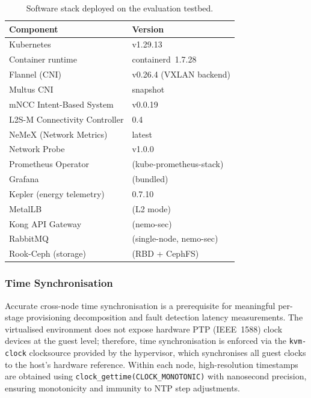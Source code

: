 \begin{table}[htbp]
  \centering
  \caption{Software stack deployed on the evaluation testbed.}
  \label{tab:software}
  \begin{tabular}{ll}
    \toprule
    \textbf{Component} & \textbf{Version} \\
    \midrule
    Kubernetes                 & v1.29.13 \\
    Container runtime          & containerd~1.7.28 \\
    Flannel (CNI)              & v0.26.4 (VXLAN backend) \\
    Multus CNI                 & snapshot \\
    mNCC Intent-Based System   & v0.0.19 \\
    L2S-M Connectivity Controller & 0.4 \\
    NeMeX (Network Metrics)    & latest \\
    Network Probe              & v1.0.0 \\
    Prometheus Operator        & (kube-prometheus-stack) \\
    Grafana                    & (bundled) \\
    Kepler (energy telemetry)  & 0.7.10 \\
    MetalLB                    & (L2 mode) \\
    Kong API Gateway           & (nemo-sec) \\
    RabbitMQ                   & (single-node, nemo-sec) \\
    Rook-Ceph (storage)        & (RBD + CephFS) \\
    \bottomrule
  \end{tabular}
\end{table}

\subsubsection{Time Synchronisation}
\label{subsubsec:ptp}

Accurate cross-node time synchronisation is a prerequisite for
meaningful per-stage provisioning decomposition and fault detection
latency measurements.
The virtualised environment does not expose hardware PTP
(IEEE~1588) clock devices at the guest level; therefore, time
synchronisation is enforced via the \texttt{kvm-clock} clocksource
provided by the hypervisor, which synchronises all guest clocks to
the host's hardware reference.
Within each node, high-resolution timestamps are obtained using
\texttt{clock\_gettime(CLOCK\_MONOTONIC)} with nanosecond
precision, ensuring monotonicity and immunity to NTP step
adjustments.

